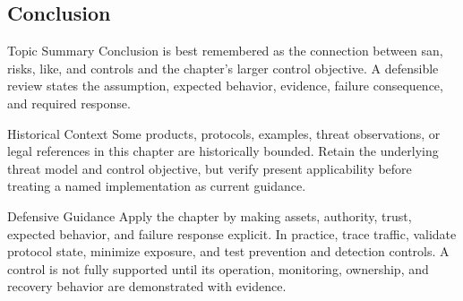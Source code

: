 \documentclass[11pt,letterpaper]{article}
\begin{document}
\subsection*{Conclusion}
\begin{CornellNotesTable}
\end{CornellNotesTable}
\begin{CornellSummaryBox}{Topic Summary}
Conclusion is best remembered as the connection between san, risks, like, and controls and the chapter's larger control objective. A defensible review states the assumption, expected behavior, evidence, failure consequence, and required response.
\end{CornellSummaryBox}
\begin{CornellWarningBox}{Historical Context}
Some products, protocols, examples, threat observations, or legal references in this chapter are historically bounded. Retain the underlying threat model and control objective, but verify present applicability before treating a named implementation as current guidance.
\end{CornellWarningBox}
\begin{CornellOverviewBox}{Defensive Guidance}
Apply the chapter by making assets, authority, trust, expected behavior, and failure response explicit. In practice, trace traffic, validate protocol state, minimize exposure, and test prevention and detection controls. A control is not fully supported until its operation, monitoring, ownership, and recovery behavior are demonstrated with evidence.
\end{CornellOverviewBox}
\end{document}
